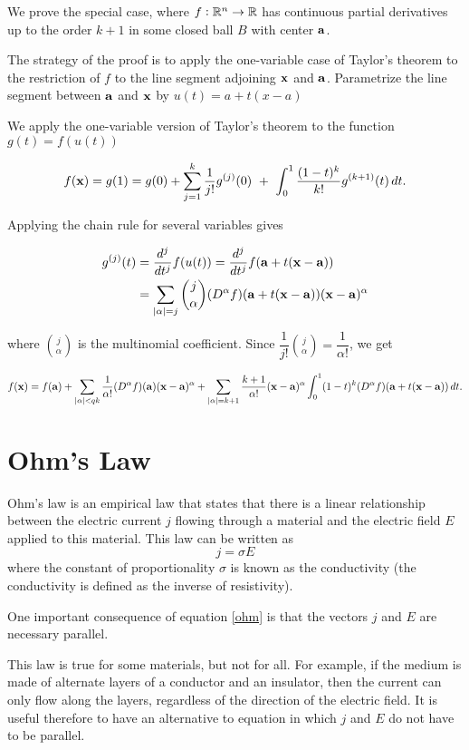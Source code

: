 We prove the special case, where $f:\mathbb{R}^n \to \mathbb{R}$ has continuous partial
derivatives up to the order $k+1$ in some closed ball $B$ with
center $\mathbf{ a}$.

The strategy of the proof is to apply the
one-variable case of Taylor's theorem to the restriction of $f$ to
the line segment adjoining $\mathbf{ x}$ and
$\mathbf{ a}$. Parametrize the line segment between
$\mathbf{ a}$ and $\mathbf{ x}$ by $u(t) = a + t(x - a)$


We apply the one-variable version
of Taylor's theorem to the function  $g(t) = f(u(t))$

\[f(\vector{x})=g(1)=g(0)+\dsum_{j=1}^k\dfrac{1}{j!}g^{(j)}(0)\ +\ \dint_0^1 
\dfrac{(1-t)^k }{k!} g^{(k+1)}(t)\, dt.\]

Applying the chain rule for several variables gives

\begin{align}
g^{(j)}(t)&=\dfrac{d^j}{dt^j}f(u(t)) = \dfrac{d^j}{dt^j} 
f(\mathbf{ a}+t(\mathbf{ x}-\mathbf{ a})) \\
&= \displaystyle\sum_{|\alpha|=j} {j\choose\alpha} 
(D^\alpha f) (\mathbf{ a}+t(\mathbf{ x}-\mathbf{ a})) 
(\mathbf{ x}-\mathbf{ a})^\alpha
\end{align}

where $\binom{j}{\alpha}$ is the
multinomial coefficient. Since
\(\dfrac{1}{j!}\binom{j}{\alpha}=\dfrac{1}{\alpha!}\),
we get

\[f(\mathbf x)= f(\mathbf a)+\displaystyle\sum_{|\alpha|<q k}\dfrac{1}{\alpha!} (D^\alpha f) 
(\mathbf a)(\mathbf x-\mathbf a)^\alpha+\displaystyle\sum_{|\alpha|=k+1}\dfrac{k+1}{\alpha!}
(\mathbf x-\mathbf a)^\alpha \displaystyle\int_0^1 (1-t)^k (D^\alpha f)(\mathbf a+t(\mathbf 
x-\mathbf a))\,dt.\]


\section{Ohm's Law}


Ohm's law  is an empirical law that states that there is a linear relationship between the electric current $j$ flowing through a material and the electric field $E$ applied to this material. 
This law can be written as
\[j = \sigma E \label{ohm}\]
where the constant of proportionality $\sigma$ is known as the conductivity (the conductivity is defined as the inverse of resistivity). 

One important consequence of   equation \ref{ohm} is that  the vectors $j$ and $E$ are necessary parallel. 

This law is true for some materials, but not for all. For example, if the medium is made of alternate layers of a conductor and an insulator, then the current can only flow along the layers, regardless of the direction of the electric field. It is useful therefore to have an alternative to equation  in which $j$ and $E$ do not have to be parallel. 

